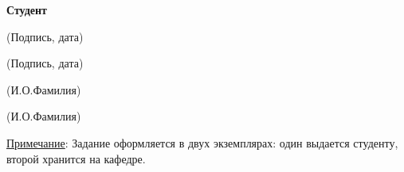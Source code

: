 \begin{titlepage}
\begin{center}
\end{center}

\begin{adjustbox}{minipage=0.35\textwidth,valign=T}
    \begin{flushleft}
        \footnotesize
        \textbf{\wleadprefix}
    \end{flushleft}
        \vspace{0em}
    \begin{flushleft}
        \footnotesize
        \textbf{Студент}
    \end{flushleft}
\end{adjustbox}
\hfill
\begin{adjustbox}{minipage=0.3\linewidth,valign=T}
        \vspace{7pt}

    \begin{center}
        \footnotesize
        \uline{\hfill}

        \scriptsize
        (Подпись, дата)
    \end{center}
    \begin{center}
        \footnotesize
        \uline{\hfill}

        \scriptsize
        (Подпись, дата)
    \end{center}
\end{adjustbox}
\hfill
\begin{adjustbox}{minipage=0.3\linewidth,valign=T}
    \wauthorspace\begin{center}
        \footnotesize
        \uline{\hfill\wfirstlead\hfill}

        \scriptsize
        (И.О.Фамилия)
    \end{center}
    \begin{center}
        \footnotesize
        \uline{\hfill\wauthor\hfill}

        \scriptsize
        (И.О.Фамилия)
    \end{center}
\end{adjustbox}

\vfill

\begin{flushleft}
\uline{Примечание}: Задание оформляется в двух экземплярах: один выдается
студенту, второй хранится на кафедре.
\end{flushleft}

\end{titlepage}
